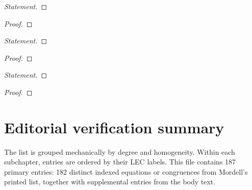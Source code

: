 \begin{proof}[Statement]\renewcommand{\qedsymbol}{}

\end{proof}
\begin{proof}[Proof]\renewcommand{\qedsymbol}{}

\end{proof}


\begin{proof}[Statement]\renewcommand{\qedsymbol}{}

\end{proof}
\begin{proof}[Proof]\renewcommand{\qedsymbol}{}

\end{proof}


\begin{proof}[Statement]\renewcommand{\qedsymbol}{}

\end{proof}
\begin{proof}[Proof]\renewcommand{\qedsymbol}{}

\end{proof}

\clearpage
\section*{Editorial verification summary}

The list is grouped mechanically by degree and homogeneity. Within each
subchapter, entries are ordered by their LEC labels. This file contains 187
primary entries: 182 distinct indexed equations or congruences from Mordell's
printed list, together with supplemental entries from the body text.

